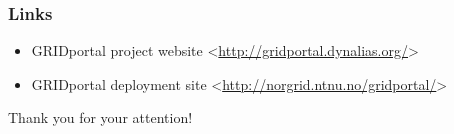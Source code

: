 \documentclass{beamer}
\begin{document}
\begin{frame}
  \frametitle{Links}

  \begin{itemize}
  	\item GRIDportal project website <\url{http://gridportal.dynalias.org/}>
  	\item GRIDportal deployment site <\url{http://norgrid.ntnu.no/gridportal/}>
  \end{itemize}
  \bigskip

  \begin{center}
  Thank you for your attention!
  \end{center}
\end{frame}
\end{document}
